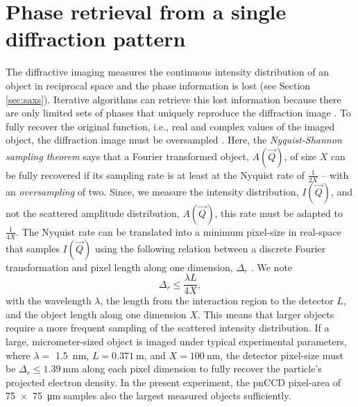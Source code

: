 \section{Phase retrieval from a single diffraction pattern}\label{sec:phase-retrieval}
The diffractive imaging measures the continuous intensity distribution of an object in reciprocal space and the phase information is lost (see Section \ref{sec:saxs}). Iterative algorithms can retrieve this lost information because there are only limited sets of phases that uniquely reproduce the diffraction image \citep{Bruck-1979-OpticsCom,Bates-1981-Optik}. To fully recover the original function, i.e., real and complex values of the imaged object, the diffraction image must be oversampled \citep{Sayre-1952-ActCryst}. Here, the \textit{Nyquist-Shannon sampling theorem} says that a Fourier transformed object, $A(\vec{Q})$, of size $X$ can be fully recovered if its sampling rate is at least at the Nyquist rate of $\tfrac{1}{2X}$ -- with an \textit{oversampling} of two. Since, we measure the intensity distribution, $I(\vec{Q})$, and not the scattered amplitude distribution, $A(\vec{Q})$, this rate must be adapted to $\tfrac{1}{4X}$. The Nyquist rate can be translated into a minimum pixel-size in real-space that samples $I(\vec{Q})$ using the following relation between a discrete Fourier transformation and pixel length along one dimension, $\Delta_{r}$ \citep{Williams-2010-NJP}. We note
\begin{equation}
\Delta_{r} \leq \frac{\lambda L}{4 X},
\label{eq:disc-fourier-relation-pixelsize}
\end{equation}
with the wavelength $\lambda$, the length from the interaction region to the detector $L$, and the object length along one dimension $X$. This means that larger objects require a more frequent sampling of the scattered intensity distribution. If a large, micrometer-sized object is imaged under typical experimental parameters, where $\lambda =$ \SI{1.5}{\nano\meter}, $L = \SI{0.371}{\meter}$, and $X=\SI{100}{\nano\meter}$, the detector pixel-size must be $\Delta_{r} \leq \SI{1.39}{\milli\meter}$ along each pixel dimension to fully recover the particle's projected electron density. In the present experiment, the pnCCD pixel-area of \SI{75 x 75}{\micro\meter} samples also the largest measured objects sufficiently.
%
%
%

